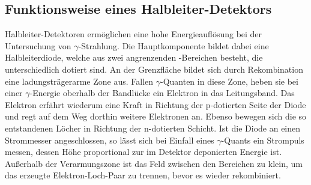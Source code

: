\subsection{Funktionsweise eines Halbleiter-Detektors}
\label{sec:HLDetektor}

Halbleiter-Detektoren ermöglichen eine hohe Energieauflösung bei der Untersuchung von $\gamma$-Strahlung.
Die Hauptkomponente bildet dabei eine Halbleiterdiode, welche aus zwei angrenzenden -Bereichen
besteht, die unterschiedlich dotiert sind.
An der Grenzfläche bildet sich durch Rekombination eine ladungsträgerarme Zone aus.
Fallen $\gamma$-Quanten in diese Zone, heben sie bei einer $\gamma$-Energie oberhalb
der Bandlücke ein Elektron in das Leitungsband.
Das Elektron erfährt wiederum eine Kraft in Richtung der p-dotierten
Seite der Diode und regt auf dem Weg dorthin weitere Elektronen an.
Ebenso bewegen sich die so entstandenen Löcher in Richtung der n-dotierten Schicht. Ist die
Diode an einen Strommesser angeschlossen, so lässt sich bei Einfall eines $\gamma$-Quants ein
Strompuls messen, dessen Höhe proportional zur im Detektor deponierten Energie ist.
Außerhalb der Verarmungszone ist das Feld zwischen den Bereichen zu klein, um das erzeugte Elektron-Loch-Paar
zu trennen, bevor es wieder rekombiniert.


